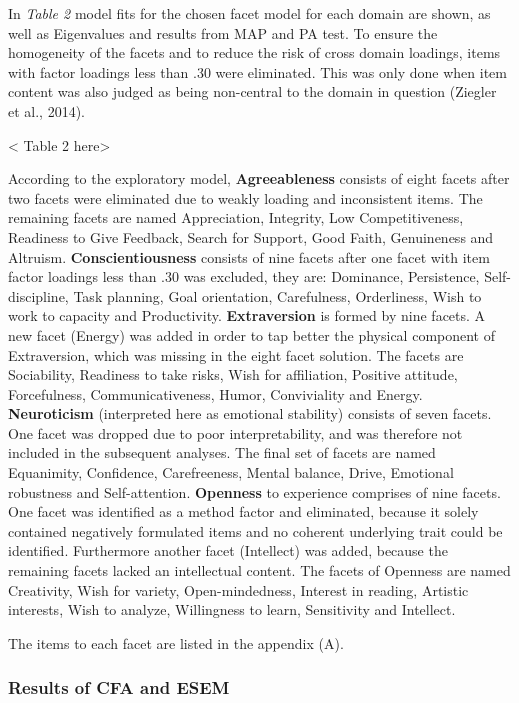 \documentclass[,man,floatsintext]{apa6}
\theoremstyle{definition}
\theoremstyle{definition}
\theoremstyle{definition}
\theoremstyle{remark}
\begin{document}
In \emph{Table 2} model fits for the chosen facet model for each domain
are shown, as well as Eigenvalues and results from MAP and PA test. To
ensure the homogeneity of the facets and to reduce the risk of cross
domain loadings, items with factor loadings less than .30 were
eliminated. This was only done when item content was also judged as
being non-central to the domain in question (Ziegler et al., 2014).

\textless{} Table 2 here\textgreater{}

According to the exploratory model, \textbf{Agreeableness} consists of
eight facets after two facets were eliminated due to weakly loading and
inconsistent items. The remaining facets are named Appreciation,
Integrity, Low Competitiveness, Readiness to Give Feedback, Search for
Support, Good Faith, Genuineness and Altruism.
\textbf{Conscientiousness} consists of nine facets after one facet with
item factor loadings less than .30 was excluded, they are: Dominance,
Persistence, Self-discipline, Task planning, Goal orientation,
Carefulness, Orderliness, Wish to work to capacity and Productivity.
\textbf{Extraversion} is formed by nine facets. A new facet (Energy) was
added in order to tap better the physical component of Extraversion,
which was missing in the eight facet solution. The facets are
Sociability, Readiness to take risks, Wish for affiliation, Positive
attitude, Forcefulness, Communicativeness, Humor, Conviviality and
Energy. \textbf{Neuroticism} (interpreted here as emotional stability)
consists of seven facets. One facet was dropped due to poor
interpretability, and was therefore not included in the subsequent
analyses. The final set of facets are named Equanimity, Confidence,
Carefreeness, Mental balance, Drive, Emotional robustness and
Self-attention. \textbf{Openness} to experience comprises of nine
facets. One facet was identified as a method factor and eliminated,
because it solely contained negatively formulated items and no coherent
underlying trait could be identified. Furthermore another facet
(Intellect) was added, because the remaining facets lacked an
intellectual content. The facets of Openness are named Creativity, Wish
for variety, Open-mindedness, Interest in reading, Artistic interests,
Wish to analyze, Willingness to learn, Sensitivity and Intellect.

The items to each facet are listed in the appendix (A).

\hypertarget{results-of-cfa-and-esem}{%
\subsubsection{Results of CFA and ESEM}\label{results-of-cfa-and-esem}}
\end{document}
